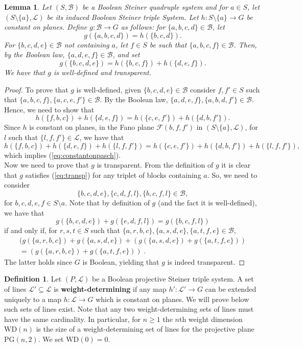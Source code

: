 \documentclass{article}
\newtheorem{lemma}[theorem]{Lemma}
\theoremstyle{remark}
\theoremstyle{definition}
\newtheorem{definition}[theorem]{Definition}
\begin{document}
\begin{lemma}\label{lem:welldefined} Let $(S, \mathcal{B})$ be a Boolean Steiner quadruple system and for $a\in S$, let $(S\setminus\{a\}, \mathcal{L})$ be its induced Boolean Steiner triple System. Let $h:S\setminus\{a\}\to G$ be constant on planes. Define $g:\mathcal{B}\to G$ as follows: for $\{a,b,c,d\}\in\mathcal{B}$, let
\[g(\{a,b,c,d\})=h(\{b,c,d\}).\]
For $\{b,c,d,e\}\in\mathcal{B}$ not containing $a$, let $f\in S$ be such that $\{a,b,c,f\}\in\mathcal{B}$. Then, by the Boolean law, $\{a,d,e,f\}\in\mathcal{B}$, and set
\[g(\{b,c,d,e\})=h(\{b,c,f\})+h(\{d,e,f\}).\]
We have that $g$ is well-defined and transparent.
\end{lemma}
\begin{proof} To prove that $g$ is well-defined, given $\{b,c,d,e\}\in\mathcal{B}$ consider $f, f'\in S$ such that $\{a,b,c,f\}, \{a, c, e, f'\}\in\mathcal{B}$. By the Boolean law, $\{a,d,e,f\}, \{a,b,d, f'\}\in\mathcal{B}$. Hence, we need to show that 
\begin{equation}\label{eq:constantonpasch}
   h(\{f, b,c\})+h(\{d,e,f\})=h(\{c,e,f'\})+h(\{d,b,f'\}).
\end{equation}
Since $h$ is constant on planes, in the Fano plane $\mathcal{F}(b, f, f')$ in $(S\setminus\{a\}, \mathcal{L})$, for $l$ such that $\{l, f, f'\}\in\mathcal{L}$, we have that 
\[h(\{f, b,c\})+h(\{d,e,f\})+h(\{l, f, f'\})=h(\{c,e,f'\})+h(\{d,b,f'\})+h(\{l, f, f'\}),\]
which implies (\ref{eq:constantonpasch}).\\

Now we need to prove that $g$ is transparent. From the definition of $g$ it is clear that $g$ satisfies (\ref{eq:transp}) for any triplet of blocks containing $a$. So, we need to consider 
\[\{b,c,d,e\}, \{c,d,f,l\}, \{b,c, f, l\}\in\mathcal{B},
\]
for $b,c,d,e,f\in S\setminus a$. Note that by definition of $g$ (and the fact it is well-defined), we have that
\[g(\{b,c,d,e\})+g(\{e,d,f,l\})= g(\{b,c, f, l\})\]
if and only if, for $r,s,t\in S$ such that $\{a, r, b, c\}, \{a, s, d, e\}, \{a, t, f, e\}\in\mathcal{B}$, 
\begin{multline*}
   (g(\{a, r, b, c\})+g(\{a, s, d, e\})+(g(\{a, s, d, e\})+g(\{a, t, f, e\}))\\
   =(g(\{a, r, b, c\})+g(\{a, t, f, e\}))\; . 
\end{multline*}
    The latter holds since $G$ is Boolean, yielding that $g$ is indeed transparent.
\end{proof}

\begin{definition} Let $(P, \mathcal{L})$ be a Boolean projective Steiner triple system. A set of lines $\mathcal{L}'\subseteq\mathcal{L}$ is \textbf{weight-determining} if any map $h':\mathcal{L}'\to G$ can be extended uniquely to a map $h:\mathcal{L}\to G$ which is constant on planes. We will prove below such sets of lines exist. Note that any two weight-determining sets of lines must have the same cardinality. In particular, for $n\geq 1$ the $n$th weight dimension $\mathrm{WD}(n)$ is the size of a weight-determining set of lines for the projective plane $\mathrm{PG}(n, 2)$. We set $\mathrm{WD}(0)=0$.
\end{definition}
\end{document}
